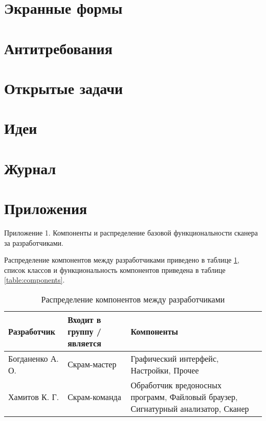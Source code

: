 \section{Экранные формы}
\section{Антитребования}
\section{Открытые задачи}
\section{Идеи}
\section{Журнал}
\section{Приложения}
Приложение 1. Компоненты и распределение базовой функциональности сканера за разработчиками.

Распределение компонентов между разработчиками приведено в таблице \ref{table:responsibilities}, список классов и функциональность компонентов приведена в таблице \ref{table:components}.
\begin{table}[h]
\centering
\begin{tabular}{|l|p{3cm}|p{3cm}|}
\hline
Разработчик & Входит в группу / является & Компоненты \\
\hline
Богданенко А. О. & Скрам-мастер & Графический интерфейс, Настройки, Прочее \\
\hline
Хамитов К. Г. & Скрам-команда & Обработчик вредоносных программ, Файловый браузер, Сигнатурный анализатор, Сканер \\
\hline
\end{tabular}
\caption{Распределение компонентов между разработчиками}
\label{table:responsibilities}
\end{table}

